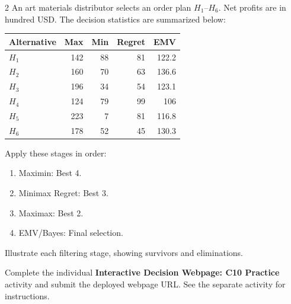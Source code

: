 \begin{multicols}{2}
\columnbreak
{}
An art materials distributor selects an order plan $H_1$--$H_6$. Net profits are in hundred USD. The decision statistics are summarized below:
\vspace{-3mm}
\begin{center}\small\setlength{\tabcolsep}{4pt}
	\begin{tabular}{lrrrr}\toprule
		Alternative & Max & Min & Regret & EMV\\ \midrule
		$H_1$ & 142 & 88 & 81 & 122.2\\
		$H_2$ & 160 & 70 & 63 & 136.6\\
		$H_3$ & 196 & 34 & 54 & 123.1\\
		$H_4$ & 124 & 79 & 99 & 106\\
		$H_5$ & 223 & 7 & 81 & 116.8\\
		$H_6$ & 178 & 52 & 45 & 130.3\\
		\bottomrule
	\end{tabular}
\end{center}
\vspace{-3mm}
Apply these stages in order:
\begin{enumerate}[leftmargin=*]
	\item Maximin: Best 4.
	\item Minimax Regret: Best 3.
	\item Maximax: Best 2.
	\item EMV/Bayes: Final selection.
\end{enumerate}
Illustrate each filtering stage, showing survivors and eliminations.

\par
{}
		Complete the individual \textbf{Interactive Decision Webpage: C10 Practice} activity and submit the deployed webpage URL. See the separate activity for instructions.
		
	\end{multicols}

